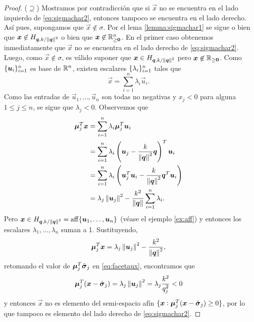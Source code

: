 \begin{proof}
	($\supseteq$) Mostramos por contradicción que si $\vec{x}$ no se encuentra en el lado izquierdo
	de \eqref{eq:sigmachar2}, entonces tampoco se encuentra en el lado derecho. Así pues, supongamos
	que $\vec{x} \not\in \sigma$. Por el lema \ref{lemma:sigmachar1} se sigue o bien que $\boldsymbol{x}
	\not\in H_{\boldsymbol{\boldsymbol{q}}, k/\left\lVert \boldsymbol{\boldsymbol{q}} \right\rVert^{2}}$ o bien que $\boldsymbol{x} \not\in \mathbb{R}^n_{\geq \boldsymbol{0}}$. En el primer caso
	obtenemos inmediatamente que $\vec{x}$ no se encuentra en el lado derecho de
	\eqref{eq:sigmachar2}. Luego, como $\vec{x} \not \in \sigma$, es válido suponer que $\boldsymbol{x} \in
	H_{\boldsymbol{\boldsymbol{q}}, k/\left\lVert \boldsymbol{\boldsymbol{q}} \right\rVert^{2}}$ pero $\boldsymbol{x} \not\in \mathbb{R}_{\geq \boldsymbol{0}}$. Como
	$\lbrace \boldsymbol{u}_i \rbrace_{i=1}^{n}$ es base de $\mathbb{R}^n$, existen escalares
	$\lbrace \lambda_i \rbrace_{i=1}^{n}$ tales que
	\begin{equation*}
		\vec{x} = \sum_{i=1}^{n}\lambda_i\vec{u}_i.
	\end{equation*}
	Como las entradas de $\vec{u}_1, \ldots, \vec{u}_n$ son todas no negativas y $x_j < 0$ para
	alguna $1 \leq j \leq n$, se sigue que $\lambda_j < 0$. Observemos que
	\begin{align*}
		\boldsymbol{\mu}_j^T\boldsymbol{x}
		&=
		\sum_{i=1}^{n}\lambda_i\boldsymbol{\mu}_j^T\boldsymbol{u}_i \\
		&=
		\sum_{i=1}^{n}\lambda_i\left(\boldsymbol{u}_j - \frac{k}{\left\lVert \boldsymbol{q} \right\rVert^2}\boldsymbol{q}\right)^T\boldsymbol{u}_i \\
		&=
		\sum_{i=1}^{n}\lambda_i\left(\boldsymbol{u}_j^T\boldsymbol{u}_i -
			\frac{k}{\left\lVert \boldsymbol{q} \right\rVert^2}\boldsymbol{q}^T\boldsymbol{u}_i\right) \\
		&=
		\lambda_j\left\lVert \boldsymbol{u}_j \right\rVert^2 - \frac{k^2}{\left\lVert \boldsymbol{q} \right\rVert} \sum_{i=1}^{n}\lambda_i.
	\end{align*}
	Pero $\boldsymbol{x} \in H_{\boldsymbol{\boldsymbol{q}}, k/\left\lVert \boldsymbol{\boldsymbol{q}} \right\rVert^{2}} = \operatorname{aff}\lbrace \boldsymbol{u}_1, \ldots, \boldsymbol{u}_n \rbrace$
	(véase el ejemplo \ref{ex:aff}) y entonces los escalares $\lambda_1, \ldots, \lambda_n$ suman a 1.
	Sustituyendo,
	\begin{equation*}
		\boldsymbol{\mu}_j^T\boldsymbol{x} = \lambda_j\left\lVert \boldsymbol{u}_j \right\rVert^2 - \frac{k^2}{\left\lVert \boldsymbol{q} \right\rVert^2},
	\end{equation*}
	retomando el valor de $\boldsymbol{\mu}_j^T\hat{\boldsymbol{ \sigma }}_j$ en \eqref{eq:facetaux}, encontramos que
	\begin{equation*}
		\boldsymbol{\mu}_j^T(\boldsymbol{x} - \hat{\boldsymbol{ \sigma }}_j) = \lambda_j\left\lVert \boldsymbol{u}_j \right\rVert^2 = \lambda_j\frac{k^2}{q_j^2} < 0
	\end{equation*}
	y entonces $\vec{x}$ no es elemento del semi-espacio afín $\lbrace \boldsymbol{x} \vcentcolon
	\boldsymbol{\mu}_j^T(\boldsymbol{x} - \hat{\boldsymbol{ \sigma }}_j) \geq 0 \rbrace$, por lo que tampoco es elemento del lado
	derecho de \eqref{eq:sigmachar2}.
\end{proof}

